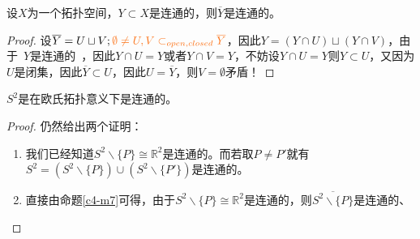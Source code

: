 \documentclass[lang=cn,10pt,device=pad]{elegantbook}
\newcommand{\tl}[1]{\textcolor{myor}{#1}}
\newcommand{\lanse}[1]{~\textcolor{myblu}{#1}~}
\newcommand{\dkh}[1]{\{#1\}}
\newcommand{\chadiao}{\backslash}
\begin{document}
\begin{proposition}[连通集合的闭包是连通的]\label{c4-m7}
	设$X$为一个拓扑空间，$Y\subset X$是连通的，则$\overline{Y}$是连通的。
\end{proposition}
\begin{proof}
	设$\overline{Y} = U\sqcup V;\tl{\emptyset\neq  U,V\subset_{open,closed}\overline{Y}}$，因此$Y = (Y\cap U)\sqcup (Y\cap V)$，由于\lanse{$Y$是连通的}，因此$Y\cap U  =Y$或者$Y\cap V=Y$，不妨设$Y\cap U=Y$则$Y\subset U$，又因为$U$是闭集，因此\tl{$\overline{Y}\subset U$}，因此$U =\overline{Y}$，则$V = \emptyset$矛盾！
\end{proof}


\begin{example}[二维单位球面是连通的]
	$S^{2}$是在欧氏拓扑意义下是连通的。
\end{example}
\begin{proof}
	仍然给出两个证明：
	\begin{enumerate}
		\item 我们已经知道$S^{2}\chadiao \dkh{P}\cong \mathbb{R}^{2}$是连通的。而若取$P\neq P'$就有$S^{2}=(S^{2}\chadiao \dkh{P})\cup(S^{2}\chadiao \dkh{P'})$是连通的。
		\item 直接由命题\ref{c4-m7}可得，由于$S^{2}\chadiao \dkh{P}\cong \mathbb{R}^{2}$是连通的，则$\overline{S^{2}\chadiao\dkh{P}}$是连通的、
	\end{enumerate}
\end{proof}
\end{document}
